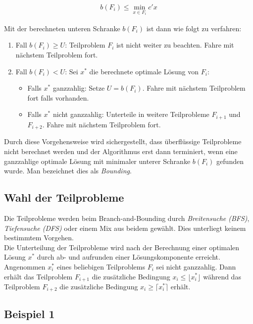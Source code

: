 \documentclass[tog]{acmsiggraph}
\begin{document}
\large
\begin{align}
\label{Eq:Bounding-Untere-Schranke}
b(F_i) \leq \min_{x \in F_i} c'x
\end{align}
\normalsize

Mit der berechneten unteren Schranke $b(F_i)$ ist dann wie folgt zu verfahren:
\begin{enumerate}
\item Fall $b(F_i) \geq U$: Teilproblem $F_i$ ist nicht weiter zu beachten. Fahre mit nächstem Teilproblem fort.
\item Fall $b(F_i) < U$: Sei $x^*$ die berechnete optimale Lösung von $F_i$:

\begin{itemize}
\item Falls $x^*$ ganzzahlig: Setze $U = b(F_i)$. Fahre mit nächstem Teilproblem fort falls vorhanden.
\item Falls $x^*$ nicht ganzzahlig: Unterteile in weitere Teilprobleme $F_{i+1}$ und $F_{i+2}$. Fahre mit nächstem Teilproblem fort.
\end{itemize}
\end{enumerate}

Durch diese Vorgehensweise wird sichergestellt, dass überflüssige Teilprobleme nicht berechnet werden und der Algorithmus erst dann terminiert, wenn eine ganzzahlige optimale Lösung mit minimaler unterer Schranke $b(F_i)$ gefunden wurde. Man bezeichnet dies als \textit{Bounding}.

\subsection*{Wahl der Teilprobleme}

Die Teilprobleme werden beim Branch-and-Bounding durch \textit{Breitensuche (BFS)}, \textit{Tiefensuche (DFS)} oder einem Mix aus beidem gewählt. Dies unterliegt keinem bestimmtem Vorgehen.\\
Die Unterteilung der Teilprobleme wird nach der Berechnung einer optimalen Lösung $x^*$ durch ab- und aufrunden einer Lösungskomponente erreicht. Angenommen $x^*_i$ eines beliebigen Teilproblems $F_i$ sei nicht ganzzahlig. Dann erhält das Teilproblem $F_{i+1}$ die zusätzliche Bedingung $x_i \leq \lfloor x^*_i \rfloor$ während das Teilproblem $F_{i+2}$ die zusätzliche Bedingung $x_i \geq \lceil x^*_i \rceil$ erhält.

\subsection*{Beispiel 1}
\end{document}
